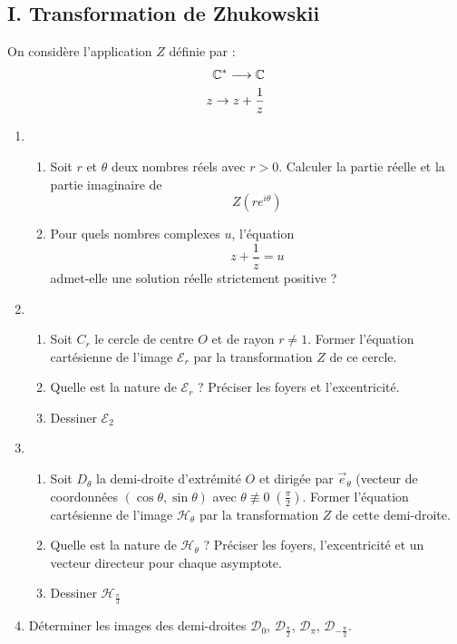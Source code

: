 \subsection*{I. Transformation de Zhukowskii}
On considère l'application $Z$ définie par :
\begin{eqnarray*}
\mathbb{C}^* \longrightarrow \mathbb{C} \\
z\rightarrow z+\frac{1}{z}
\end{eqnarray*}
\begin{enumerate}
\item \begin{enumerate}
 \item Soit $r$ et $\theta$ deux nombres réels avec $r>0$. Calculer la partie réelle et la partie imaginaire de 
\[Z(re^{i\theta})\]
\item Pour quels nombres complexes $u$, l'équation
\begin{displaymath}
 z+\dfrac{1}{z} = u
\end{displaymath}
admet-elle une solution réelle strictement positive ? 
\end{enumerate}
\item \begin{enumerate}
\item Soit $C_r$ le cercle de centre $O$ et de rayon $r \neq 1$. Former l'équation cartésienne de l'image $\mathcal{E}_r$ par la transformation $Z$ de ce cercle.
\item Quelle est la nature de $\mathcal{E}_r$ ? Préciser les foyers et l'excentricité.
\item  Dessiner $\mathcal{E}_2$ 
\end{enumerate}
\item \begin{enumerate}
\item Soit $D_\theta$ la demi-droite d'extrémité $O$ et dirigée par $\overrightarrow{e}_\theta$ (vecteur de coordonnées $(\cos \theta, \sin \theta)$ avec $\theta \not \equiv 0 \;(\frac{\pi}{2})$.  Former l'équation cartésienne de l'image $\mathcal{H}_\theta$ par la transformation $Z$ de cette demi-droite.
\item Quelle est la nature de $\mathcal{H}_\theta$ ? Préciser les foyers, l'excentricité et un vecteur directeur pour chaque asymptote.
\item  Dessiner $\mathcal{H}_{\frac{\pi}{3}}$ 
\end{enumerate}
\item Déterminer les images des demi-droites $\mathcal D_0$, $\mathcal D_\frac{\pi}{2}$, $\mathcal D_\pi$, $\mathcal D_{-\frac{\pi}{2}}$.
\end{enumerate}
